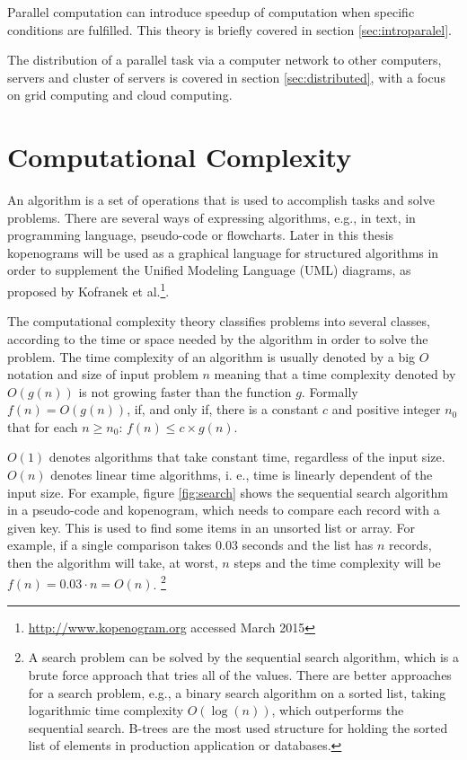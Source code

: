 Parallel computation can introduce speedup of computation when specific conditions are fulfilled. This theory is briefly covered in section \ref{sec:introparalel}.

The distribution of a parallel task via a computer network to other computers, servers and cluster of servers is covered in section \ref{sec:distributed}, with a focus on grid computing and cloud computing.

\section{Computational Complexity}
\label{sec:introcomplexity}

An algorithm is a set of operations that is used to accomplish tasks and solve problems. There are several ways of expressing algorithms, e.g., in text, in programming language, pseudo-code or flowcharts. Later in this thesis kopenograms will be used as a graphical language for structured algorithms in order to supplement the Unified Modeling Language (UML) diagrams, as proposed by Kofranek et al.\cite{Kofranek2012}\footnote{\url{http://www.kopenogram.org} accessed March 2015}.

The computational complexity theory classifies problems into several classes, according to the time or space needed by the algorithm in order to solve the problem. The time complexity of an algorithm is usually denoted by a big $O$ notation and size of input problem $n$ meaning that a time complexity denoted by $O(g(n))$ is not growing faster than the function $g$. Formally $f(n)=O(g(n))$, if, and only if, there is a constant $c$ and positive integer $n_0$ that for each $n\geq n_0$: $f(n) \leq c \times g(n)$.

$O(1)$ denotes algorithms that take constant time, regardless of the input size. $O(n)$ denotes linear time algorithms, i. e., time is linearly dependent of the input size. For example, figure \ref{fig:search} shows the sequential search algorithm in a pseudo-code and kopenogram, which needs to compare each record with a given key. This is used to find some items in an unsorted list or array. For example, if a single comparison takes $0.03$ seconds and the list has $n$ records, then the algorithm will take, at worst, $n$ steps and the time complexity will be $f(n) = 0.03 \cdot n = O(n)$. \footnote{A search problem can be solved by the sequential search algorithm, which is a brute force approach that tries all of the values. There are better approaches for a search problem, e.g., a binary search algorithm on a sorted list, taking logarithmic time complexity $O(\log(n))$, which outperforms the sequential search. B-trees are the most used structure for holding the sorted list of elements in production application or databases\cite{Bayer1972Org,Bayer1972Sym}.}

